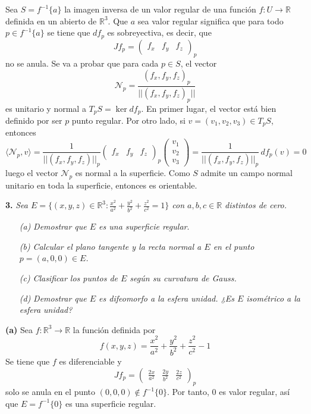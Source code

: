 \documentclass[12pt]{report}
\newcommand{\R}{\mathbb R}
\begin{document}
\vspace{2mm}
Sea $S = f^{-1}\{a\}$ la imagen inversa de un valor regular de una función $f \colon U \to \R$ definida en un abierto de $\R^3$. Que $a$ sea valor regular significa que para todo $p \in f^{-1}\{a\}$ se tiene que $df_p$ es sobreyectiva, es decir, que
\[Jf_p = \begin{pmatrix}
    f_x & f_y & f_z
\end{pmatrix}_p\]
no se anula. Se va a probar que para cada $p \in S$, el vector
\[\mathcal{N}_p = \frac{(f_x,f_y,f_z)_p}{||(f_x,f_y,f_z)_p||}\]
es unitario y normal a $T_pS = \ker df_p$. En primer lugar, el vector está bien definido por ser $p$ punto regular. Por otro lado, si $v = (v_1,v_2,v_3) \in T_pS$, entonces
\[\langle \mathcal{N}_p,v \rangle = \frac{1}{||(f_x,f_y,f_z)||_p}\begin{pmatrix}
    f_x & f_y & f_z
\end{pmatrix}_p \begin{pmatrix}
    v_1 \\
    v_2 \\
    v_3
\end{pmatrix} = \frac{1}{||(f_x,f_y,f_z)||_p} \, df_p(v) = 0\]
luego el vector $\mathcal{N}_p$ es normal a la superficie. Como $S$ admite un campo normal unitario en toda la superficie, entonces es orientable.

\pagebreak

\vspace{4mm}
\textbf{3. } \textit{Sea $E = \{(x,y,z) \in \R^3 \colon \frac{x^2}{a^2}+\frac{y^2}{b^2}+\frac{z^2}{c^2} = 1\}$ con $a,b,c \in \R$ distintos de cero.}
\begin{itemize}
    \item[\textit{(a)}] \textit{Demostrar que $E$ es una superficie regular}.
    \item[\textit{(b)}] \textit{Calcular el plano tangente y la recta normal a $E$ en el punto $p = (a,0,0) \in E$.}
    \item[\textit{(c)}] \textit{Clasificar los puntos de $E$ según su curvatura de Gauss.}
    \item[\textit{(d)}] \textit{Demostrar que $E$ es difeomorfo a la esfera unidad. ¿Es $E$ isométrico a la esfera unidad?}
\end{itemize}

\vspace{2mm}
\textbf{(a)} Sea $f \colon \R^3 \to \R$ la función definida por
\[f(x,y,z) = \frac{x^2}{a^2}+\frac{y^2}{b^2}+\frac{z^2}{c^2} - 1 \]
Se tiene que $f$ es diferenciable y
\[Jf_p =\begin{pmatrix}
    \frac{2x}{a^2} & \frac{2y}{b^2} & \frac{2z}{c^2}
\end{pmatrix}_p\]
solo se anula en el punto $(0,0,0) \notin f^{-1}\{0\}$. Por tanto, $0$ es valor regular, así que $E = f^{-1}\{0\}$ es una superficie regular.
\end{document}
